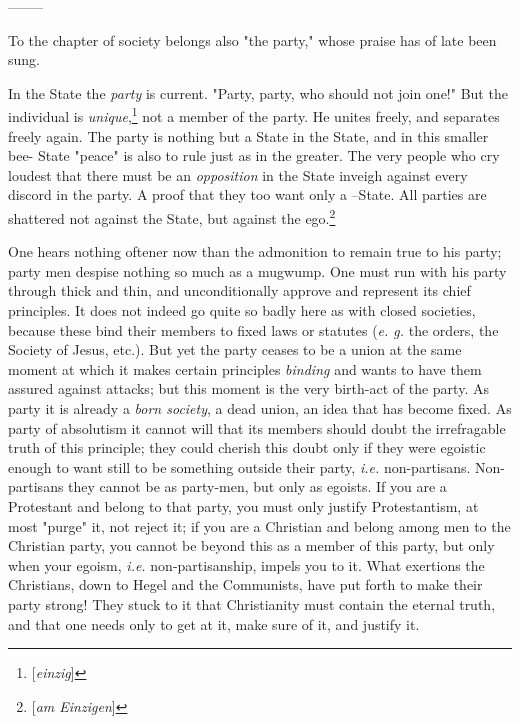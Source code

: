 \begin{center}
--------\end{center}


To the chapter of society belongs also "{}the party,"{} whose praise has of 
late been sung.

In the State the \textit{party} is current. "{}Party, party, who should not 
join one!"{} But the individual is 
\textit{unique},\footnote{[\textit{einzig}]} not a member of the party. He 
unites freely, and separates freely again. The party is nothing but a State in 
the State, and in this smaller bee- State "{}peace"{} is also to rule just as 
in the greater. The very people who cry loudest that there must be an 
\textit{opposition} in the State inveigh against every discord in the party. A 
proof that they too want only a --State. All parties are shattered not against 
the State, but against the ego.\footnote{[\textit{am Einzigen}]}

One hears nothing oftener now than the admonition to remain true to his party; 
party men despise nothing so much as a mugwump. One must run with his party 
through thick and thin, and unconditionally approve and represent its chief 
principles. It does not indeed go quite so badly here as with closed 
societies, because these bind their members to fixed laws or statutes 
(\textit{e. g.} the orders, the Society of Jesus, etc.). But yet the party 
ceases to be a union at the same moment at which it makes certain principles 
\textit{binding} and wants to have them assured against attacks; but this 
moment is the very birth-act of the party. As party it is already a 
\textit{born society}, a dead union, an idea that has become fixed. As party 
of absolutism it cannot will that its members should doubt the irrefragable 
truth of this principle; they could cherish this doubt only if they were 
egoistic enough to want still to be something outside their party, 
\textit{i.e.} non-partisans. Non-partisans they cannot be as party-men, but 
only as egoists. If you are a Protestant and belong to that party, you must 
only justify Protestantism, at most "{}purge"{} it, not reject it; if you are 
a Christian and belong among men to the Christian party, you cannot be beyond 
this as a member of this party, but only when your egoism, \textit{i.e.} 
non-partisanship, impels you to it. What exertions the Christians, down to 
Hegel and the Communists, have put forth to make their party strong! They 
stuck to it that Christianity must contain the eternal truth, and that one 
needs only to get at it, make sure of it, and justify it.

